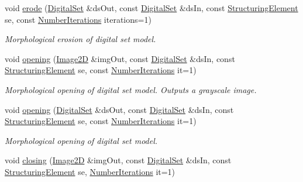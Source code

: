 \begin{DoxyCompactItemize}
void \hyperlink{namespaceDIPaCUS_1_1Morphology_a592a651d48216270bfd75bcebe63eec7}{erode} (\hyperlink{namespaceDIPaCUS_1_1Morphology_ab69fa725716b0ed4c311c0d00a292be7}{Digital\+Set} \&ds\+Out, const \hyperlink{namespaceDIPaCUS_1_1Morphology_ab69fa725716b0ed4c311c0d00a292be7}{Digital\+Set} \&ds\+In, const \hyperlink{structDIPaCUS_1_1Morphology_1_1StructuringElement}{Structuring\+Element} se, const \hyperlink{namespaceDIPaCUS_1_1Morphology_a8ffa7d1c2023be8b21bc87a4b7df7cca}{Number\+Iterations} iterations=1)
\begin{DoxyCompactList}\small\item\em Morphological erosion of digital set model. \end{DoxyCompactList}\item 
void \hyperlink{namespaceDIPaCUS_1_1Morphology_a3ee880acb47a35ab065d52ce51a0c99c}{opening} (\hyperlink{namespaceDIPaCUS_1_1Morphology_a9aff9edf28d681accfc54435fbefcbee}{Image2D} \&img\+Out, const \hyperlink{namespaceDIPaCUS_1_1Morphology_ab69fa725716b0ed4c311c0d00a292be7}{Digital\+Set} \&ds\+In, const \hyperlink{structDIPaCUS_1_1Morphology_1_1StructuringElement}{Structuring\+Element} se, const \hyperlink{namespaceDIPaCUS_1_1Morphology_a8ffa7d1c2023be8b21bc87a4b7df7cca}{Number\+Iterations} it=1)
\begin{DoxyCompactList}\small\item\em Morphological opening of digital set model. Outputs a grayscale image. \end{DoxyCompactList}\item 
void \hyperlink{namespaceDIPaCUS_1_1Morphology_ae3b5ddf7edad964159147df450c23783}{opening} (\hyperlink{namespaceDIPaCUS_1_1Morphology_ab69fa725716b0ed4c311c0d00a292be7}{Digital\+Set} \&ds\+Out, const \hyperlink{namespaceDIPaCUS_1_1Morphology_ab69fa725716b0ed4c311c0d00a292be7}{Digital\+Set} \&ds\+In, const \hyperlink{structDIPaCUS_1_1Morphology_1_1StructuringElement}{Structuring\+Element} se, const \hyperlink{namespaceDIPaCUS_1_1Morphology_a8ffa7d1c2023be8b21bc87a4b7df7cca}{Number\+Iterations} it=1)
\begin{DoxyCompactList}\small\item\em Morphological opening of digital set model. \end{DoxyCompactList}\item 
void \hyperlink{namespaceDIPaCUS_1_1Morphology_a5855de805a41a85c6e932fe291f3cbed}{closing} (\hyperlink{namespaceDIPaCUS_1_1Morphology_a9aff9edf28d681accfc54435fbefcbee}{Image2D} \&img\+Out, const \hyperlink{namespaceDIPaCUS_1_1Morphology_ab69fa725716b0ed4c311c0d00a292be7}{Digital\+Set} \&ds\+In, const \hyperlink{structDIPaCUS_1_1Morphology_1_1StructuringElement}{Structuring\+Element} se, \hyperlink{namespaceDIPaCUS_1_1Morphology_a8ffa7d1c2023be8b21bc87a4b7df7cca}{Number\+Iterations} it=1)

\end{DoxyCompactItemize}

